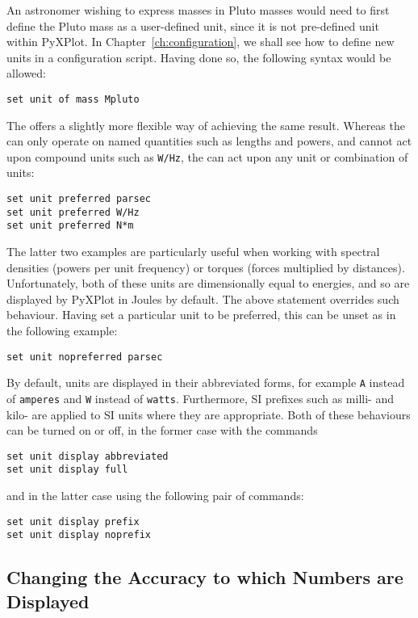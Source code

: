 An astronomer wishing to express masses in Pluto masses would need to first
define the Pluto mass as a user-defined unit, since it is not pre-defined unit
within PyXPlot. In Chapter~\ref{ch:configuration}, we shall see how to define
new units in a configuration script. Having done so, the following syntax would
be allowed:
\begin{verbatim}
set unit of mass Mpluto
\end{verbatim}

The  offers a slightly more flexible way of
achieving the same result. Whereas the  can only operate
on named quantities such as lengths and powers, and cannot act upon compound
units such as {\tt W/Hz}, the  can act upon any
unit or combination of units:
\begin{verbatim}
set unit preferred parsec
set unit preferred W/Hz
set unit preferred N*m
\end{verbatim}
The latter two examples are particularly useful when working with spectral
densities (powers per unit frequency) or torques (forces multiplied by
distances). Unfortunately, both of these units are dimensionally equal to
energies, and so are displayed by PyXPlot in Joules by default. The above
statement overrides such behaviour. Having set a particular unit to be
preferred, this can be unset as in the following example:
\begin{verbatim}
set unit nopreferred parsec
\end{verbatim}

By default, units are displayed in their abbreviated forms, for example {\tt A}
instead of {\tt amperes} and {\tt W} instead of {\tt watts}. Furthermore, SI
prefixes such as milli- and kilo- are applied to SI units where they are
appropriate. Both of these
behaviours can be turned on or off, in the former case with the commands

\begin{verbatim}
set unit display abbreviated
set unit display full
\end{verbatim}

\noindent and in the latter case using the following pair of commands:

\begin{verbatim}
set unit display prefix
set unit display noprefix
\end{verbatim}

\subsection{Changing the Accuracy to which Numbers are Displayed}

